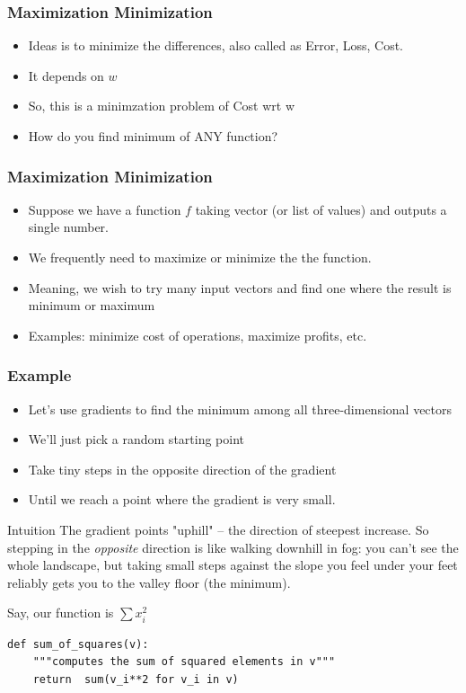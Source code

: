 \begin{frame}[fragile]\frametitle{Maximization Minimization}
\begin{itemize}
\item  Ideas is to minimize the differences, also called as Error, Loss, Cost.
\item It depends on $w$
\item So, this is a minimzation problem of Cost wrt w
\item How do you find minimum of ANY function?
\end{itemize}
\end{frame}


\begin{frame}[fragile]\frametitle{Maximization Minimization}
\begin{itemize}
\item  Suppose we have a function $f$ taking vector (or list of values) and outputs a single number.
\item We frequently need to maximize or minimize the the function.
\item Meaning, we wish to try many input vectors and find one where the result is minimum or maximum
\item Examples: minimize cost of operations, maximize profits, etc.
\end{itemize}
\end{frame}

\begin{frame}[fragile]\frametitle{Example}

\begin{itemize}
\item Let's use gradients to find the minimum among all three-dimensional vectors
\item We'll just pick a random starting point
\item Take tiny steps in the opposite direction of the gradient
\item Until we reach a point where the gradient is very small.
\end{itemize}

\begin{block}{Intuition}
The gradient points "uphill" -- the direction of steepest increase. So stepping in the \emph{opposite} direction is like walking downhill in fog: you can't see the whole landscape, but taking small steps against the slope you feel under your feet reliably gets you to the valley floor (the minimum).
\end{block}

Say, our function is $\sum x_i ^2$
\begin{lstlisting}
def sum_of_squares(v):
	"""computes	the sum of squared elements in v"""
	return	sum(v_i**2 for v_i in v)
\end{lstlisting}

\end{frame}

